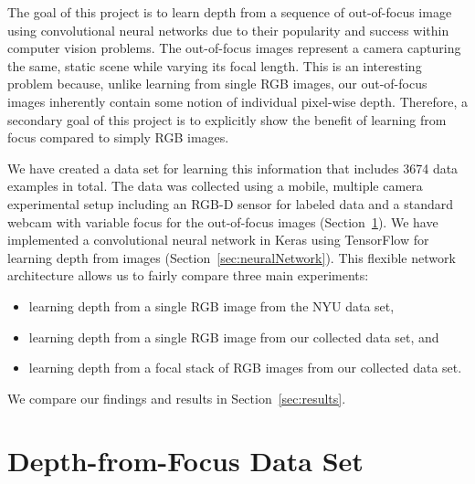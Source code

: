 \documentclass[letterpaper, 10 pt, conference]{ieeeconf}  %
\begin{document}
The goal of this project is to learn depth from a sequence of out-of-focus image using convolutional neural networks due to their popularity and success within computer vision problems. The out-of-focus images represent a camera capturing the same, static scene while varying its focal length. This is an interesting problem because, unlike learning from single RGB images, our out-of-focus images inherently contain some notion of individual pixel-wise depth. Therefore, a secondary goal of this project is to explicitly show the benefit of learning from focus compared to simply RGB images. 

We have created a data set for learning this information that includes 3674 data examples in total. The data was collected using a mobile, multiple camera experimental setup including an RGB-D sensor for labeled data and a standard webcam with variable focus for the out-of-focus images (Section~\ref{sec:dataSet}).
We have implemented a convolutional neural network in Keras using TensorFlow for learning depth from images (Section~\ref{sec:neuralNetwork}). This flexible network architecture allows us to fairly compare three main experiments:
\begin{itemize}
    \item[\textbf{1)}] learning depth from a single RGB image from the NYU data set, 
    \item[\textbf{2)}] learning depth from a single RGB image from our collected data set, and
    \item[\textbf{3)}] learning depth from a focal stack of RGB images from our collected data set. 
\end{itemize}
We compare our findings and results in Section~\ref{sec:results}.

\section{Depth-from-Focus Data Set}
\label{sec:dataSet}
\end{document}
